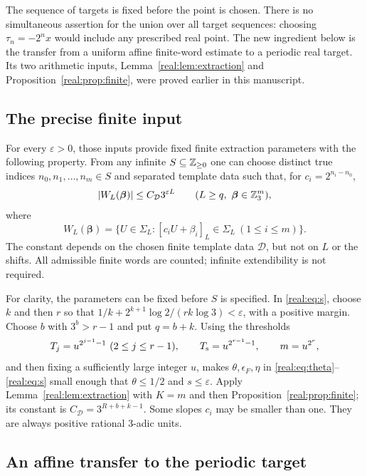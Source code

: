 The sequence of targets is fixed before the point is chosen. There is
no simultaneous assertion for the union over all target sequences:
choosing $\tau_n=-2^nx$ would include any prescribed real point.
The new ingredient below is the transfer from a uniform affine
finite-word estimate to a periodic real target. Its two arithmetic
inputs, Lemma~\ref{real:lem:extraction} and
Proposition~\ref{real:prop:finite}, were proved earlier in this manuscript.

\subsection{The precise finite input}

For every $\varepsilon>0$, those inputs provide fixed finite extraction
parameters with the following property. From any infinite
$S\subseteq\mathbb Z_{\ge0}$ one can choose distinct true indices
$n_0,n_1,\ldots,n_m\in S$ and separated template data such that, for
$c_i=2^{n_i-n_0}$,
\begin{equation}\label{circle:eq:input}
 \left|W_L(\boldsymbol\beta)\right|\le C_{\mathcal D}3^{\varepsilon L}
 \qquad(L\ge q,\ \boldsymbol\beta\in\mathbb Z_3^m),
\end{equation}
where
\[
 W_L(\boldsymbol\beta)=
 \{U\in\Sigma_L:[c_iU+\beta_i]_L\in\Sigma_L\ (1\le i\le m)\}.
\]
The constant depends on the chosen finite template data $\mathcal D$,
but not on $L$ or the shifts. All admissible finite words are counted;
infinite extendibility is not required.

For clarity, the parameters can be fixed before $S$ is specified.
In \eqref{real:eq:s}, choose $k$ and then $r$ so that
$1/k+2^{k+1}\log2/(rk\log3)<\varepsilon$, with a positive margin.
Choose $b$ with $3^b>r-1$ and put $q=b+k$. Using the thresholds
\[
 T_j=u^{2^{j-1}-1}\ (2\le j\le r-1),\qquad
 T_{\rm s}=u^{2^{r-1}-1},\qquad m=u^{2^r},
\]
and then fixing a sufficiently large integer $u$, makes
$\theta,\epsilon_F,\eta$ in
\eqref{real:eq:theta}--\eqref{real:eq:s} small enough that
$\theta\le1/2$ and $s\le\varepsilon$. Apply
Lemma~\ref{real:lem:extraction} with $K=m$ and then
Proposition~\ref{real:prop:finite}; its constant is
$C_{\mathcal D}=3^{R+b+k-1}$. Some slopes $c_i$ may be smaller than one.
They are always positive rational $3$-adic units.

\subsection{An affine transfer to the periodic target}

